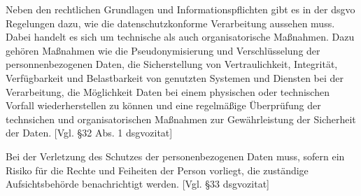 
Neben den rechtlichen Grundlagen und Informationspflichten gibt es in der \gls{dsgvo} Regelungen dazu, wie die datenschutzkonforme Verarbeitung aussehen muss. Dabei handelt es sich um technische als auch organisatorische Maßnahmen. Dazu gehören Maßnahmen wie die Pseudonymisierung und Verschlüsselung der personnenbezogenen Daten, die Sicherstellung von Vertraulichkeit, Integrität, Verfügbarkeit und Belastbarkeit von genutzten Systemen und Diensten bei der Verarbeitung, die Möglichkeit Daten bei einem physischen oder technischen Vorfall wiederherstellen zu können und eine regelmäßige Überprüfung der technsichen und organisatorischen Maßnahmen zur Gewährleistung der Sicherheit der Daten. [Vgl. §32 Abs. 1 \gls{dsgvozitat}]

Bei der Verletzung des Schutzes der personenbezogenen Daten muss, sofern ein Risiko für die Rechte und Feiheiten der Person vorliegt, die zuständige Aufsichtsbehörde benachrichtigt werden. [Vgl. §33 \gls{dsgvozitat}]



